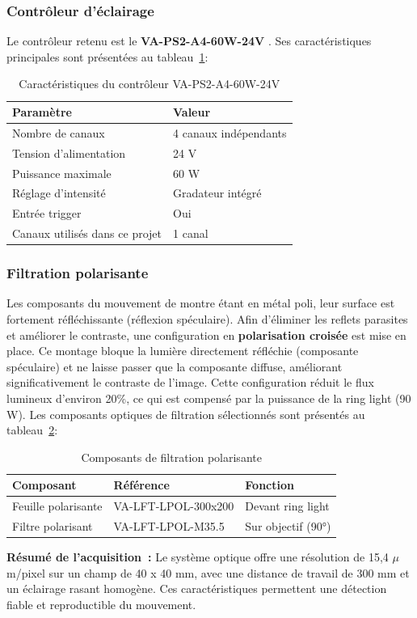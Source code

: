 \subsubsection{Contrôleur d'éclairage}
Le contrôleur retenu est le \textbf{VA-PS2-A4-60W-24V} \cite{va_imaging_ps2}. 
Ses caractéristiques principales sont présentées au tableau~\ref{tab:specs_controller}:
\begin{table}[H]
  \centering
  \caption{Caractéristiques du contrôleur VA-PS2-A4-60W-24V}
  \label{tab:specs_controller}
  \begin{tabular}{ll}
    \toprule
    \textbf{Paramètre} & \textbf{Valeur} \\
    \midrule
    Nombre de canaux & 4 canaux indépendants \\
    Tension d'alimentation & 24 V \\
    Puissance maximale & 60 W \\
    Réglage d'intensité & Gradateur intégré \\
    Entrée trigger & Oui \\
    Canaux utilisés dans ce projet & 1 canal \\
    \bottomrule
  \end{tabular}
\end{table}
\subsubsection{Filtration polarisante}
Les composants du mouvement de montre étant en métal poli, leur surface est fortement réfléchissante (réflexion spéculaire). 
Afin d'éliminer les reflets parasites et améliorer le contraste, une configuration en \textbf{polarisation croisée} est mise en place. 
Ce montage bloque la lumière directement réfléchie (composante spéculaire) et ne laisse passer que la composante diffuse, améliorant significativement le contraste de l'image. 
Cette configuration réduit le flux lumineux d'environ 20\%, ce qui est compensé par la puissance de la ring light (90 W).
Les composants optiques de filtration sélectionnés sont présentés au tableau~\ref{tab:specs_filters}:
\begin{table}[H]
  \centering
  \caption{Composants de filtration polarisante}
  \label{tab:specs_filters}
  \begin{tabular}{lll}
    \toprule
    \textbf{Composant} & \textbf{Référence} & \textbf{Fonction} \\
    \midrule
    Feuille polarisante & VA-LFT-LPOL-300x200 \cite{va_imaging_lft_sheet} & Devant ring light \\
    Filtre polarisant & VA-LFT-LPOL-M35.5 \cite{va_imaging_lft_lens} & Sur objectif (90°) \\
    \bottomrule
  \end{tabular}
\end{table}
\textbf{Résumé de l'acquisition~:} Le système optique offre une résolution de 15,4 $\mu$m/pixel sur un champ de 40 x 40 mm, avec une distance de travail de 300 mm et un éclairage rasant homogène. 
Ces caractéristiques permettent une détection fiable et reproductible du mouvement.

